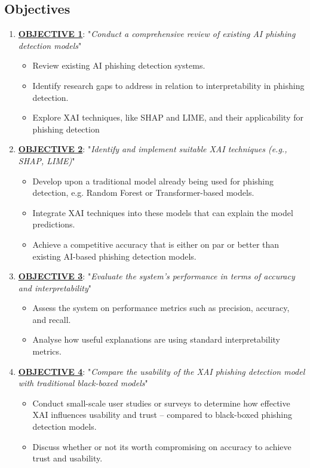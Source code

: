 
\subsection{Objectives}

\begin{enumerate}
  \item \uline{\textbf{OBJECTIVE 1}}: "\textit{Conduct a comprehensive review of existing AI phishing detection models}\label{objective-1}"
  \begin{itemize}
    \item Review existing AI phishing detection systems.
    \item Identify research gaps to address in relation to interpretability in phishing detection.
    \item Explore XAI techniques, like SHAP and LIME, and their applicability for phishing detection
    \end{itemize}
  \item \uline{\textbf{OBJECTIVE 2}}: "\textit{Identify and implement suitable XAI techniques (e.g., SHAP, LIME)}\label{objective-2}"
  \begin{itemize}
    \item Develop upon a traditional model already being used for phishing detection, e.g. Random Forest or Transformer-based models.
    \item Integrate XAI techniques into these models that can explain the model predictions.
    \item Achieve a competitive accuracy that is either on par or better than existing AI-based phishing detection models.
  \end{itemize}
\item \uline{\textbf{OBJECTIVE 3}}: "\textit{Evaluate the system's performance in terms of accuracy and interpretability}\label{objective-3}"
  \begin{itemize}
    \item Assess the system on performance metrics such as precision, accuracy, and recall.
    \item Analyse how useful explanations are using standard interpretability metrics.
  \end{itemize}
\item \uline{\textbf{OBJECTIVE 4}}: "\textit{Compare the usability of the XAI phishing detection model with traditional black-boxed models}\label{objective-4}"
  \begin{itemize}
    \item Conduct small-scale user studies or surveys to determine how effective XAI influences usability and trust -- compared to black-boxed phishing detection models.
    \item Discuss whether or not its worth compromising on accuracy to achieve trust and usability.
  \end{itemize}
\end{enumerate}
